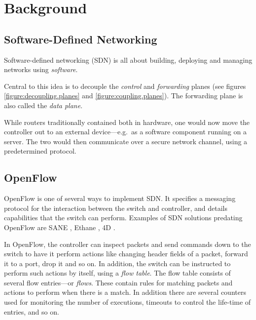 \chapter{Background}
\label{chapter:background}

\section{Software-Defined Networking}
\label{chapter:background.openflow}

Software-defined networking (\acs{SDN}) \cite{openflow.whitepaper.2012}
is all about building, deploying and managing networks using
\textit{software}.

Central to this idea is to decouple the \textit{control} and
\textit{forwarding} planes
(see figures \ref{figure:decoupling.planes} and \ref{figure:coupling.planes}).
The forwarding plane is also called the \textit{data plane}.

While routers traditionally contained both in hardware, one would now move
the controller out to an external device---e.g.~as a software component
running on a server.  The two would then communicate over a secure network
channel, using a predetermined protocol.

\section{OpenFlow}
\label{chapter:openflow.background}

OpenFlow \cite{McKeown:2008:OEI:1355734.1355746,openflow-1.0} is one of
several ways to implement \acs{SDN}.
%
It specifies a messaging protocol for the interaction between the switch and
controller, and details capabilities that the switch can perform.
%
Examples of \ac{SDN} solutions predating OpenFlow are SANE
\cite{Casado:2006:SPA:1267336.1267346}, Ethane
\cite{Casado:2007:ETC:1282427.1282382}, 4D
\cite{Greenberg:2005:CSA:1096536.1096541}.

In OpenFlow, the controller can inspect packets and send commands down to
the switch to have it perform actions like changing header fields of a
packet, forward it to a port, drop it and so on.
%
In addition, the switch can be instructed to perform such actions by itself,
using a \textit{flow table}.
%
The flow table consists of several flow entries---or \textit{flows}.
%
These contain rules for matching packets and actions to perform when there
is a match.
%
In addition there are several counters used for monitoring the number of
executions, timeouts to control the life-time of entries, and so on.

